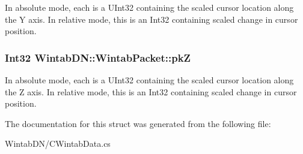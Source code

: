 In absolute mode, each is a UInt32 containing the scaled cursor location along the Y axis. In relative mode, this is an Int32 containing scaled change in cursor position. 

\hypertarget{struct_wintab_d_n_1_1_wintab_packet_ac5525a22d05a0a38e4522d9abbd91bb2}{
\subsubsection[{pkZ}]{\setlength{\rightskip}{0pt plus 5cm}Int32 {\bf WintabDN::WintabPacket::pkZ}}}
\label{struct_wintab_d_n_1_1_wintab_packet_ac5525a22d05a0a38e4522d9abbd91bb2}


In absolute mode, each is a UInt32 containing the scaled cursor location along the Z axis. In relative mode, this is an Int32 containing scaled change in cursor position. 



The documentation for this struct was generated from the following file:\begin{DoxyCompactItemize}
\item 
WintabDN/CWintabData.cs\end{DoxyCompactItemize}
